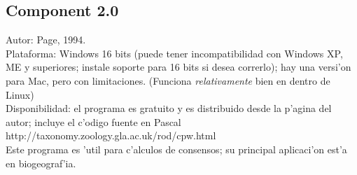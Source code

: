 \subsection{Component 2.0}
\noindent
Autor: Page, 1994. \\
Plataforma: Windows 16 bits (puede tener incompatibilidad con Windows XP, ME y superiores; instale soporte para 16 bits si desea correrlo); hay una versi'on para Mac, pero con limitaciones.  (Funciona \textit{relativamente} bien en  dentro de Linux)\\
Disponibilidad: el programa es gratuito y es distribuido desde la p'agina del autor; incluye el c'odigo fuente en Pascal\\
http://taxonomy.zoology.gla.ac.uk/rod/cpw.html
\\
Este programa es 'util para c'alculos de consensos; su principal aplicaci'on est'a en biogeograf'ia.